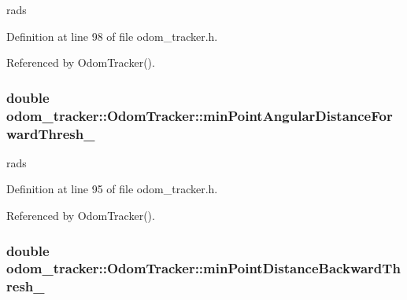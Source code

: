 rads 



Definition at line 98 of file odom\+\_\+tracker.\+h.



Referenced by Odom\+Tracker().

\subsubsection[{\texorpdfstring{min\+Point\+Angular\+Distance\+Forward\+Thresh\+\_\+}{minPointAngularDistanceForwardThresh_}}]{\setlength{\rightskip}{0pt plus 5cm}double odom\+\_\+tracker\+::\+Odom\+Tracker\+::min\+Point\+Angular\+Distance\+Forward\+Thresh\+\_\+\hspace{0.3cm}{\ttfamily [protected]}}\hypertarget{classodom__tracker_1_1OdomTracker_acd2883047a61afe3f574af0995ef7a09}{}\label{classodom__tracker_1_1OdomTracker_acd2883047a61afe3f574af0995ef7a09}


rads 



Definition at line 95 of file odom\+\_\+tracker.\+h.



Referenced by Odom\+Tracker().

\subsubsection[{\texorpdfstring{min\+Point\+Distance\+Backward\+Thresh\+\_\+}{minPointDistanceBackwardThresh_}}]{\setlength{\rightskip}{0pt plus 5cm}double odom\+\_\+tracker\+::\+Odom\+Tracker\+::min\+Point\+Distance\+Backward\+Thresh\+\_\+\hspace{0.3cm}{\ttfamily [protected]}}\hypertarget{classodom__tracker_1_1OdomTracker_ae168f975b648874e7f00c2431683b3b1}{}\label{classodom__tracker_1_1OdomTracker_ae168f975b648874e7f00c2431683b3b1}


